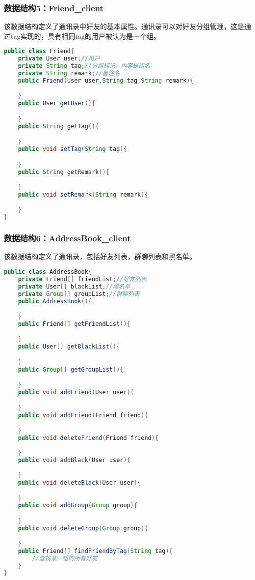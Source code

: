 \subsubsection{数据结构5：Friend\_client}
该数据结构定义了通讯录中好友的基本属性。通讯录可以对好友分组管理，这是通过tag实现的，具有相同tag的用户被认为是一个组。
\begin{lstlisting}[language=Java, caption=Friend定义]
public class Friend{
    private User user;//用户
    private String tag;//分组标记，内容是组名
    private String remark;//备注名
    public Friend(User user,String tag,String remark){

    }
    public User getUser(){

    }
    public String getTag(){

    }
    public void setTag(String tag){

    }
    public String getRemark(){

    }
    public void setRemark(String remark){

    }
}
\end{lstlisting}

\subsubsection{数据结构6：AddressBook\_client}
该数据结构定义了通讯录，包括好友列表，群聊列表和黑名单。
\begin{lstlisting}[language=Java, caption=AddressBook定义]
public class AddressBook{
    private Friend[] friendList;//好友列表
    private User[] blackList;//黑名单
    private Group[] groupList;//群聊列表
    public AddressBook(){

    }
    public Friend[] getFriendList(){

    }
    public User[] getBlackList(){

    }
    public Group[] getGroupList(){

    }
    public void addFriend(User user){

    }
    public void addFriend(Friend friend){

    }
    public void deleteFriend(Friend friend){
        
    }
    public void addBlack(User user){

    }
    public void deleteBlack(User user){

    }
    public void addGroup(Group group){

    }
    public void deleteGroup(Group group){

    }
    public Friend[] findFriendByTag(String tag){
        //查找某一组的所有好友
    }
}
\end{lstlisting}

